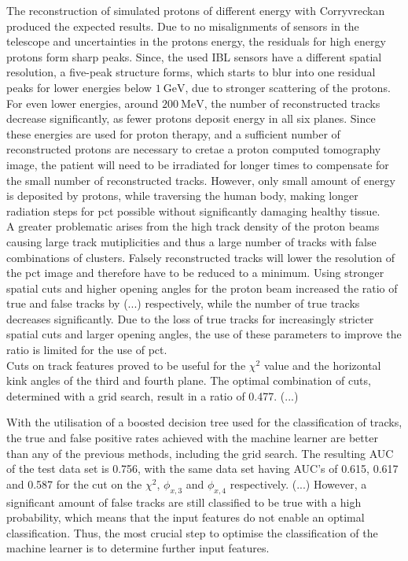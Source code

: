 The reconstruction of simulated protons of different energy with Corryvreckan produced the expected results. Due to no misalignments of sensors in the telescope and uncertainties
in the protons energy, the residuals for high energy protons form sharp peaks. Since, the used IBL sensors have a different spatial resolution, a five-peak structure
forms, which starts to blur into one residual peaks for lower energies below $\SI{1}{\giga\eV}$, due to stronger scattering of the protons. For even lower energies,
around $\SI{200}{\mega\eV}$, the number of reconstructed tracks decrease significantly, as fewer protons deposit energy in all six planes. Since these energies are
used for proton therapy, and a sufficient number of reconstructed protons are necessary to cretae a proton computed tomography image, the patient
will need to be irradiated for longer times to compensate for the small number of reconstructed tracks. However, only small amount of energy is deposited by protons, while traversing
the human body, making longer radiation steps for pct possible without significantly damaging healthy tissue. \\
A greater problematic arises from the high track density of the proton beams causing large track mutiplicities and thus a large number of tracks with false combinations of
clusters. Falsely reconstructed tracks will lower the resolution of the pct image and therefore have to be reduced to a minimum. Using stronger spatial cuts and higher
opening angles for the proton beam increased the ratio of true and false tracks by (...) respectively, while the number of true tracks decreases significantly. Due to the loss of
true tracks for increasingly stricter spatial cuts and larger opening angles, the use of these parameters to improve the ratio is limited for the use of pct. \\
Cuts on track features proved to be useful for the $\chi^2$ value and the horizontal kink angles of the third and fourth plane. The optimal combination of cuts, determined
with a grid search, result in a ratio of 0.477. (...)

With the utilisation of a boosted decision tree used for the classification of tracks, the true and false positive rates achieved with the machine learner are better
than any of the previous methods, including the grid search. The resulting AUC of the test data set is 0.756, with the same data set having AUC's of
0.615, 0.617 and 0.587 for the cut on the $\chi^2$, $\phi_{x,3}$ and $\phi_{x,4}$ respectively. (...)
However, a significant amount of false tracks are still classified to be true
with a high probability, which means that the input features do not enable an optimal classification. Thus, the most crucial step to optimise the classification of the machine learner is
to determine further input features. \\

